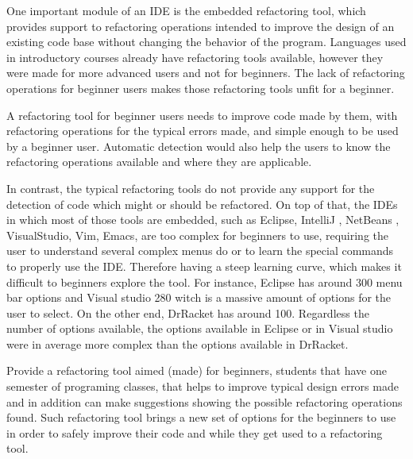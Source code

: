 One important module of an IDE is the embedded refactoring tool, %
which provides support to refactoring operations intended to improve the design
of an existing code base \cite{fowler1999refactoring} without changing the behavior of the program.
Languages used in introductory courses already have refactoring tools available,
however they were made for more advanced users and not for beginners.
The lack of refactoring operations for beginner users makes those refactoring tools
unfit for a beginner.

A refactoring tool for beginner users needs to improve code made by them, %
with refactoring operations for the typical errors made, and simple enough to be
used by a beginner user.
Automatic detection would also help the users to know the refactoring operations
available and where they are applicable.

In contrast, the typical refactoring tools do not provide any support for the detection of code which might or should %
be refactored.
On top of that, the IDEs in which most of those tools are embedded, such as Eclipse\cite{carlson2005eclipse},
 IntelliJ \cite{bock2011intellij}, NetBeans \cite{boudreau2002netbeans}, VisualStudio\cite{ford2011coding},
 Vim\cite{moolenaar2008vim}, Emacs\cite{stallman2007gnu}, are too complex for beginners
 to use, requiring the user to understand several complex menus do or to learn
 the special commands to properly use the IDE.
Therefore having a steep learning curve, which makes it difficult to beginners
explore the tool. %
For instance, Eclipse has around 300 menu bar options and Visual studio 280 witch is a massive amount
of options for the user to select.
On the other end, DrRacket has around 100. %
Regardless the number of options available, the options available in Eclipse or
in Visual studio were in average more complex than the options available in DrRacket.

Provide a refactoring tool aimed (made) for beginners, students that have one semester %
of programing classes, that helps to improve typical design errors made and in addition can
make suggestions showing the possible refactoring operations found.
Such refactoring tool brings a new set of options for the beginners to use
in order to safely improve their code and while they get used to a refactoring tool.


